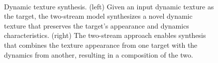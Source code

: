 \begin{figure}[t]
\begin{center}
	\\
	\caption[Dynamic texture synthesis.]{Dynamic texture synthesis. (left) Given an input dynamic texture as the target, the two-stream model synthesizes a novel dynamic texture that preserves the target's appearance and dynamics characteristics. (right) The two-stream approach enables synthesis that combines the texture appearance from one target with the dynamics from another, resulting in a composition of the two.}
	\vspace{-0.65cm}
	\label{fig:teaser}
\end{center}
\end{figure}